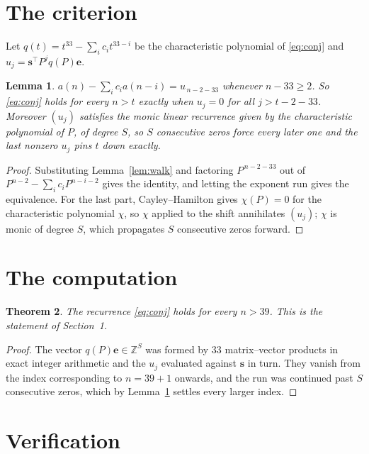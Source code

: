 \documentclass[11pt,a4paper]{article}
\theoremstyle{plain}
\newtheorem{theorem}{Theorem}
\newtheorem{lemma}[theorem]{Lemma}
\theoremstyle{definition}
\begin{document}
\section{The criterion}

Let $q(t)=t^{33}-\sum_i c_i t^{33-i}$ be the characteristic polynomial of
\eqref{eq:conj} and $u_j=\mathbf{s}^{\!\top}P^{j}q(P)\mathbf{e}$.

\begin{lemma}\label{lem:crit}
$a(n)-\sum_i c_i a(n-i)=u_{\,n-2-33}$ whenever $n-33\ge2$. So \eqref{eq:conj}
holds for every $n>t$ exactly when $u_j=0$ for all $j>t-2-33$. Moreover $(u_j)$
satisfies the monic linear recurrence given by the characteristic polynomial of $P$, of
degree $S$, so $S$ consecutive zeros force every later one and the last nonzero $u_j$ pins
$t$ down exactly.
\end{lemma}

\begin{proof}
Substituting Lemma~\ref{lem:walk} and factoring $P^{\,n-2-33}$ out of
$P^{n-2}-\sum_i c_i P^{n-i-2}$ gives the identity, and letting the exponent run gives the
equivalence. For the last part, Cayley--Hamilton gives $\chi(P)=0$ for the characteristic
polynomial $\chi$, so $\chi$ applied to the shift annihilates $(u_j)$; $\chi$ is monic of
degree $S$, which propagates $S$ consecutive zeros forward.
\end{proof}

\section{The computation}

\begin{theorem}
The recurrence \eqref{eq:conj} holds for every $n>39$. This is the statement of
Section~1.
\end{theorem}

\begin{proof}
The vector $q(P)\mathbf{e}\in\mathbb{Z}^{S}$ was formed by $33$ matrix--vector
products in exact integer arithmetic and the $u_j$ evaluated against $\mathbf{s}$ in turn.
They vanish from the index corresponding to $n=39+1$ onwards, and the run was continued
past $S$ consecutive zeros, which by Lemma~\ref{lem:crit} settles every larger index.
\end{proof}

\section{Verification}
\end{document}
